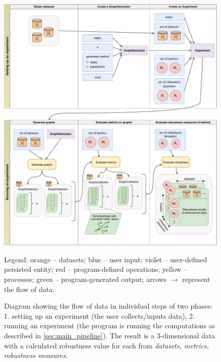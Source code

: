 \begin{figure}
    \includegraphics[width=\linewidth]{main_data_flow.pdf}
    \caption{Diagram showing the flow of data in individual steps of two phases: 1. setting up an experiment (the user collects/inputs data), 2. running an experiment (the program is running the computations as described in \autoref{sec:main_pipeline}). The result is a 3-dimensional data with a calculated robustness value for each from \textsl{datasets, metrics, robustness measures}.}\label{fig:main_data_flow}
    \footnotesize\justify\vspace{-0.4\baselineskip}
    Legend: \textcolor{diag-orange}{orange} -- datasets; \textcolor{diag-blue}{blue} -- user input; \textcolor{diag-violet}{violet} -- user-defined persisted entity; \textcolor{diag-red}{red} -- program-defined operations; \textcolor{diag-yellow}{yellow} -- processes; \textcolor{diag-green}{green} -- program-generated output; arrows $\rightarrow$ represent the flow of data.
\end{figure}
